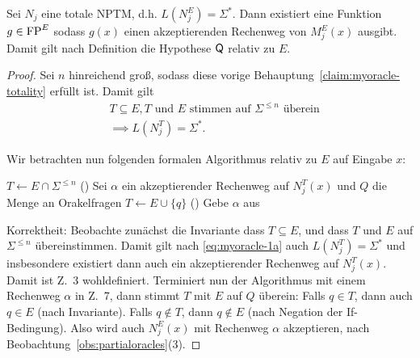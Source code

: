 \begin{claim}\label{claim:myoracle-q}
    Sei $N_j$ eine totale NPTM, d.h. $L(N_j^E)=\Sigma^*$. Dann existiert eine Funktion $g\in \mathrm{FP}^E$ sodass $g(x)$ einen akzeptierenden Rechenweg von $M^E_j(x)$ ausgibt. Damit gilt nach Definition die Hypothese $\mathsf{Q}$ relativ zu $E$.
\end{claim}
\begin{proof}
    Sei $n$ hinreichend groß, sodass diese vorige Behauptung~\ref{claim:myoracle-totality} erfüllt ist.
    Damit gilt
    \begin{equation} \begin{split}&T\subseteq E, \text{$T$ und $E$ stimmen auf $\Sigma^{\leq n}$ überein} \\ &\implies L(N_j^{T})=\Sigma^*.\end{split}\label{eq:myoracle-1a} \end{equation}

    Wir betrachten nun folgenden formalen Algorithmus relativ zu $E$ auf Eingabe $x$:\\
    \begin{algorithm}[H]
        $T\gets E\cap\Sigma^{\leq n}$ 
        \Loop(){}
        {
            Sei $\alpha$ ein akzeptierender Rechenweg auf $N_j^{T}(x)$ und $Q$ die Menge an Orakelfragen\;
            {
                $T\gets E \cup \{q\}$\;
            }
            \Else(){
                Gebe {$\alpha$} aus\;
            }
        }
    \end{algorithm}

    Korrektheit: Beobachte zunächst die Invariante dass $T\subseteq E$, und dass $T$ und $E$ auf $\Sigma^{\leq n}$ übereinstimmen.
    Damit gilt nach \eqref{eq:myoracle-1a} auch $L(N_j^{T})=\Sigma^*$ und insbesondere existiert dann auch ein akzeptierender Rechenweg auf $N_j^{T}(x)$. Damit ist Z.~3 wohldefiniert.
    Terminiert nun der Algorithmus mit einem Rechenweg $\alpha$ in Z.~7, 
    dann stimmt $T$ mit $E$ auf $Q$ überein: 
    Falls $q\in T$, dann auch $q\in E$ (nach Invariante).
    Falls $q\not\in T$, dann $q\not\in E$ (nach Negation der If-Bedingung).
    Also wird auch $N_j^E(x)$ mit Rechenweg $\alpha$ akzeptieren, nach Beobachtung~\ref{obs:partialoracles}(3).


\end{proof}
